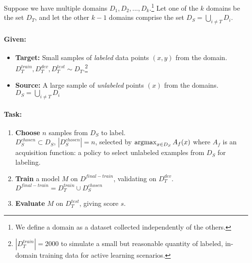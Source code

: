 Suppose we have multiple domains $D_1, D_2, ..., D_k$.\footnote{We define a domain as a dataset collected independently of the others.}
Let one of the $k$ domains be the \target{} set $D_T$, and let the other $k-1$ domains comprise the \source{} set $D_S=\bigcup\limits_{i\neq T} D_{i}$.

\respace
\respace
\paragraph{Given:}
\begin{itemize}\itemsep0em
    \item \textbf{Target:} Small samples of \textit{labeled} data points $(x, y)$ from the \target{} domain. \\
    $D_T^{train},D_T^{dev}, D_T^{test} \sim D_T$.\footnote{$|D_T^{train}|=2000$ to simulate a small but reasonable quantity of labeled, in-domain training data for active learning scenarios.}
    \item  \textbf{Source:} A large sample of \textit{unlabeled} points $(x)$ from the \source{} domains. \\
    $D_S=\bigcup\limits_{i\neq T} D_{i}$
\end{itemize}
\respace
\paragraph{Task:}
\begin{enumerate}\itemsep0em
    \item \textbf{Choose} $n$ samples from $D_S$ to label. \\
    $D_{S}^{chosen} \subset D_S$, $|D_{S}^{chosen}|=n$, selected by $ \mathop{\mathrm{argmax}}_{x \in D_S} A_{f}(x) $ where $ A_{f} $ is an acquisition function: a policy to select unlabeled examples from $D_S$ for labeling.
    \item \textbf{Train} a model $M$ on $D^{final-train}$, validating on $D_{T}^{dev}$. \\
    $D^{final-train} = D_T^{train} \cup D_S^{chosen}$
    \item \textbf{Evaluate} $M$ on $D_T^{test}$, giving score $s$.
\end{enumerate}

